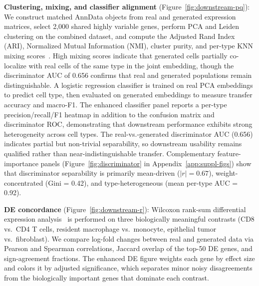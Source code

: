 \documentclass[11pt,a4paper]{article}
\begin{document}
\textbf{Clustering, mixing, and classifier alignment} (Figure~\ref{fig:downstream-pq}): We construct matched AnnData objects from real and generated expression matrices, select 2,000 shared highly variable genes, perform PCA and Leiden~\cite{ref-leiden} clustering on the combined dataset, and compute the Adjusted Rand Index (ARI), Normalized Mutual Information (NMI), cluster purity, and per-type KNN mixing scores~\cite{ref-integration-benchmark}. High mixing scores indicate that generated cells partially co-localize with real cells of the same type in the joint embedding, though the discriminator AUC of 0.656 confirms that real and generated populations remain distinguishable. A logistic regression classifier is trained on real PCA embeddings to predict cell type, then evaluated on generated embeddings to measure transfer accuracy and macro-F1. The enhanced classifier panel reports a per-type precision/recall/F1 heatmap in addition to the confusion matrix and discriminator ROC, demonstrating that downstream performance exhibits strong heterogeneity across cell types. The real-vs.-generated discriminator AUC (0.656) indicates partial but non-trivial separability, so downstream usability remains qualified rather than near-indistinguishable transfer. Complementary feature-importance panels (Figure~\ref{fig:discriminator} in Appendix~\ref{app:suppl-figs}) show that discriminator separability is primarily mean-driven ($|r| = 0.67$), weight-concentrated (Gini = 0.42), and type-heterogeneous (mean per-type AUC = 0.92).

\textbf{DE concordance} (Figure~\ref{fig:downstream-r}): Wilcoxon rank-sum differential expression analysis~\cite{ref-wilcoxon} is performed on three biologically meaningful contrasts (CD8 vs.\ CD4 T cells, resident macrophage vs.\ monocyte, epithelial tumor vs.\ fibroblast). We compare log-fold changes between real and generated data via Pearson and Spearman correlations, Jaccard overlap of the top-50 DE genes, and sign-agreement fractions. The enhanced DE figure weights each gene by effect size and colors it by adjusted significance, which separates minor noisy disagreements from the biologically important genes that dominate each contrast.
\end{document}

